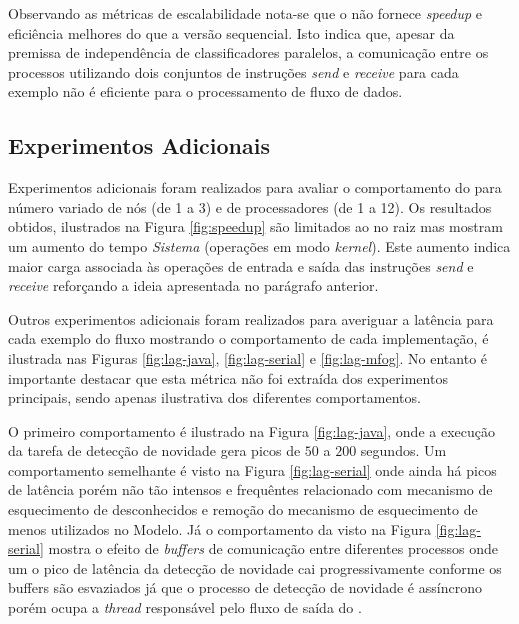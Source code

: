Observando as métricas de escalabilidade nota-se que o \mfog não fornece
\emph{speedup} e eficiência melhores do que a versão sequencial.
Isto indica que, apesar da premissa de independência de classificadores
paralelos, a comunicação entre os processos utilizando dois conjuntos de
instruções \mpi \emph{send} e \emph{receive} para cada exemplo não é eficiente
para o processamento de fluxo de dados.

\subsection{Experimentos Adicionais}

Experimentos adicionais foram realizados para avaliar o comportamento do \mfog
para número variado de nós (de 1 a 3) e de processadores (de 1 a 12).
Os resultados obtidos, ilustrados na Figura \ref{fig:speedup} são limitados ao
no raiz mas mostram um aumento do tempo \emph{Sistema} (operações em modo
\emph{kernel}).
Este aumento indica maior carga associada às operações de entrada e saída das
instruções \emph{send} e \emph{receive} reforçando a ideia apresentada no
parágrafo anterior.

Outros experimentos adicionais foram realizados para averiguar a latência para
cada exemplo do fluxo mostrando o comportamento de cada implementação, é
ilustrada nas Figuras \ref{fig:lag-java}, \ref{fig:lag-serial} e
\ref{fig:lag-mfog}.
No entanto é importante destacar que esta métrica não foi extraída dos
experimentos principais, sendo apenas ilustrativa dos diferentes comportamentos.

O primeiro comportamento é ilustrado na Figura \ref{fig:lag-java}, onde a execução
da tarefa de detecção de novidade gera picos de $50$ a $200$ segundos.
Um comportamento semelhante é visto na Figura \ref{fig:lag-serial} onde ainda há
picos de latência porém não tão intensos e frequêntes relacionado com mecanismo
de esquecimento de desconhecidos e remoção do mecanismo de esquecimento de
\mclusters menos utilizados no Modelo.
Já o comportamento da visto na Figura \ref{fig:lag-serial} mostra o efeito de
\emph{buffers} de comunicação entre diferentes processos onde um o pico de latência
da detecção de novidade cai progressivamente conforme os buffers são esvaziados
já que o processo de detecção de novidade é assíncrono porém ocupa a \emph{thread}
responsável pelo fluxo de saída do \mfog.

